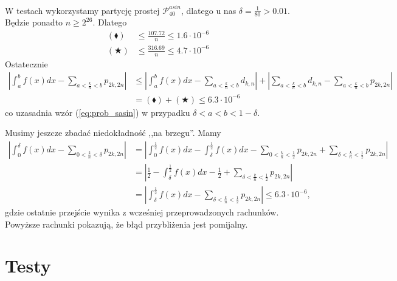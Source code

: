 \documentclass[a4paper,11pt,twoside]{book}
\theoremstyle{definition}
\begin{document}
W testach wykorzystamy partycję prostej $\mathcal{P}^{asin}_{40}$, dlatego u nas $\delta = \frac{1}{80} > 0.01$. Będzie ponadto $n \geq 2^{26}$. Dlatego
\begin{equation*}
 \begin{split}
  (\blacklozenge) &\leq \frac{107.72}{n} \leq 1.6 \cdot 10^{-6} \\
  (\bigstar) &\leq \frac{316.69}{n} \leq 4.7 \cdot 10^{-6}
 \end{split}
\end{equation*}
Ostatecznie
\begin{equation*}
\begin{split}
\left| \int_a^b f(x) dx - \sum\limits_{a < \frac{k}{n} < b} p_{2k,2n} \right|
  &\leq \left| \int_a^b f(x) dx - \sum\limits_{a < \frac{k}{n} < b} d_{k,n} \right| +  \left| \sum\limits_{a < \frac{k}{n} < b} d_{k,n} - \sum\limits_{a < \frac{k}{n} < b} p_{2k,2n} \right| \\
  &= (\blacklozenge) + (\bigstar) \leq 6.3 \cdot 10^{-6}
\end{split} 
\end{equation*}
co uzasadnia wzór (\ref{eq:prob_sasin}) w przypadku $\delta < a < b < 1 - \delta$. 

Musimy jeszcze zbadać niedokładność ,,na brzegu''. Mamy
\begin{equation*}
\begin{split}
  \left| \int_0^\delta f(x) dx - \sum\limits_{0 < \frac{k}{n} < \delta} p_{2k,2n} \right| &= \left| \int_0^{\frac{1}{2}} f(x) dx -  \int_\delta^{\frac{1}{2}} f(x) dx - \sum\limits_{0 < \frac{k}{n} < \frac{1}{2}} p_{2k,2n} + \sum\limits_{\delta < \frac{k}{n} < \frac{1}{2}} p_{2k,2n} \right| \\
  &= \left| \frac{1}{2} -  \int_\delta^{\frac{1}{2}} f(x) dx - \frac{1}{2} + \sum\limits_{\delta < \frac{k}{n} < \frac{1}{2}} p_{2k,2n} \right| \\
  &= \left|\int_\delta^{\frac{1}{2}} f(x) dx - \sum\limits_{\delta < \frac{k}{n} < \frac{1}{2}} p_{2k,2n} \right| \leq 6.3 \cdot 10^{-6},
\end{split}
\end{equation*}
gdzie ostatnie przejście wynika z wcześniej przeprowadzonych rachunków. Powyższe rachunki pokazują, że błąd przybliżenia jest pomijalny.


\chapter{Testy}
\label{czesc:testy}
\end{document}
